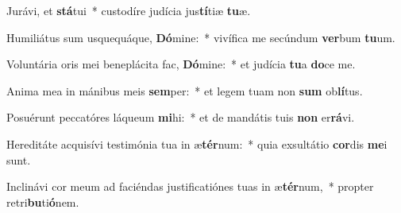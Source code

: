 \item Jurávi, et \textbf{stá}tui~* custodíre judícia jus\textbf{tí}tiæ \textbf{tu}æ.
\item Humiliátus sum usquequáque, \textbf{Dó}mine:~* vivífica me secúndum \textbf{ver}bum \textbf{tu}um.
\item Voluntária oris mei beneplácita fac, \textbf{Dó}mine:~* et judícia \textbf{tu}a \textbf{do}ce me.
\item Anima mea in mánibus meis \textbf{sem}per:~* et legem tuam non \textbf{sum} ob\textbf{lí}tus.
\item Posuérunt peccatóres láqueum \textbf{mi}hi:~* et de mandátis tuis \textbf{non} er\textbf{rá}vi.
\item Hereditáte acquisívi testimónia tua in æ\textbf{tér}num:~* quia exsultátio \textbf{cor}dis \textbf{me}i sunt.
\item Inclinávi cor meum ad faciéndas justificatiónes tuas in æ\textbf{tér}num,~* propter retri\textbf{bu}ti\textbf{ó}nem.
